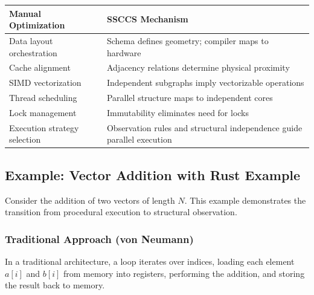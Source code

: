 \documentclass[
  a4paper,
  DIV=11,
  numbers=noendperiod]{scrartcl}
\begin{document}
\begin{longtable}[]{@{}
  >{\raggedright\arraybackslash}p{}
  >{\raggedright\arraybackslash}p{}@{}}
\toprule\noalign{}
\begin{minipage}[b]{\linewidth}\raggedright
Manual Optimization
\end{minipage} & \begin{minipage}[b]{\linewidth}\raggedright
SSCCS Mechanism
\end{minipage} \\
\midrule\noalign{}
\endhead
\bottomrule\noalign{}
\endlastfoot
Data layout orchestration & Schema defines geometry; compiler maps to
hardware \\
Cache alignment & Adjacency relations determine physical proximity \\
SIMD vectorization & Independent subgraphs imply vectorizable
operations \\
Thread scheduling & Parallel structure maps to independent cores \\
Lock management & Immutability eliminates need for locks \\
Execution strategy selection & Observation rules and structural
independence guide parallel execution \\
\end{longtable}

\subsection{Example: Vector Addition with Rust
Example}\label{example-vector-addition-with-rust-example}

Consider the addition of two vectors of length \(N\). This example
demonstrates the transition from procedural execution to structural
observation.

\subsubsection{Traditional Approach (von
Neumann)}\label{traditional-approach-von-neumann}

In a traditional architecture, a loop iterates over indices, loading
each element \(a[i]\) and \(b[i]\) from memory into registers,
performing the addition, and storing the result back to memory.
\end{document}

